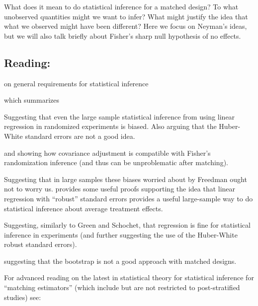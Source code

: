 \documentclass[10pt]{article}
\begin{document}
What does it mean to do statistical inference for a matched design? To what
unobserved quantities might we want to infer? What might justify the idea that
what we observed might have been different? Here we focus on Neyman's ideas,
but we will also talk briefly about Fisher's sharp null hypothesis of no
effects.

\subsection{Reading:}

\citet[Chap 6,7,17]{imbens2009causal}


\citet[Chap 4]{berk04} on general requirements for statistical
inference

\citet[Chap 2]{rosenbaum2010design}

\citet[Chap 17]{imbens2009causal}

\cite[Appendix A-32 and 33]{fpp07} which summarizes \cite{neyman:1923}

\cite{freedman2008randomization,freedman2008rae,freedman2007rae,Free:2006:On-t}
Suggesting that even the large sample statistical inference from using
linear regression in randomized experiments is biased. Also arguing
that the Huber-White standard errors are not a good idea.

\cite{rosenbaum:2002a} and \cite{bowers2011fish} showing how
covariance adjustment is compatible with Fisher's randomization
inference (and thus can be unproblematic after matching).

\cite{schochet2009regression,green2009ec} Suggesting that in large
samples these biases worried about by Freedman ought not to worry
us. \cite{linlr:2011} provides some useful proofs supporting the idea
that linear regression with ``robust'' standard errors provides a
useful large-sample way to do statistical inference about average
treatment effects.

\citet[Chap 6--8]{imbens2009causal} Suggesting, similarly to Green and
Schochet, that regression is fine for statistical inference in
experiments (and further suggesting the use of the Huber-White robust
standard errors).

\citet{AbadImbe:2004:On-t} suggesting that the bootstrap is not a good
approach with matched designs.

For advanced reading on the latest in statistical theory for
statistical inference for ``matching estimators'' (which include but
are not restricted to post-stratified studies) see:
\end{document}

